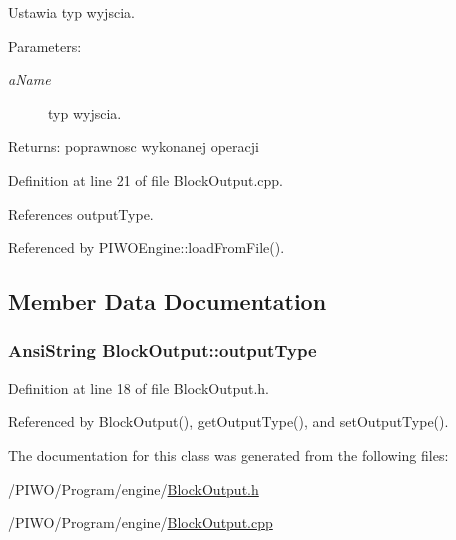 Ustawia typ wyjscia. \begin{Desc}
\item[Parameters:]
\begin{description}
\item[{\em aName}]typ wyjscia. \end{description}
\end{Desc}
\begin{Desc}
\item[Returns:]poprawnosc wykonanej operacji \end{Desc}


Definition at line 21 of file BlockOutput.cpp.

References outputType.

Referenced by PIWOEngine::loadFromFile().

\subsection{Member Data Documentation}
\hypertarget{classBlockOutput_80c32707c6e84083f5e69cf6170a3f26}{
\subsubsection[outputType]{\setlength{\rightskip}{0pt plus 5cm}AnsiString {\bf BlockOutput::outputType}}}
\label{classBlockOutput_80c32707c6e84083f5e69cf6170a3f26}




Definition at line 18 of file BlockOutput.h.

Referenced by BlockOutput(), getOutputType(), and setOutputType().

The documentation for this class was generated from the following files:\begin{CompactItemize}
\item 
/PIWO/Program/engine/\hyperlink{BlockOutput_8h}{BlockOutput.h}\item 
/PIWO/Program/engine/\hyperlink{BlockOutput_8cpp}{BlockOutput.cpp}\end{CompactItemize}
